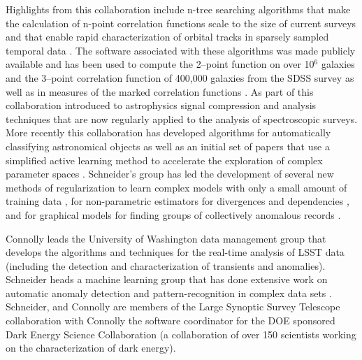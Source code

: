 \documentclass[prd,nofootbib,floatfix,11pt,tightenlines]{revtex4}
\begin{document}
Highlights from this collaboration include n-tree searching algorithms
that make the calculation of n-point correlation functions scale to
the size of current surveys \cite{GrayMoore} and that enable rapid
characterization of orbital tracks in sparsely sampled temporal data
\cite{kubica}. The software associated with these algorithms was made
publicly available and has been used to compute the 2--point function
on over 10$^6$ galaxies and the 3--point correlation function of
400,000 galaxies from the SDSS survey
\cite{Scranton2002,Szapudi2002,Nichol2006,mcbride2011a,mcbride2011b}
as well as in measures of the marked correlation functions
\cite{Skibba2006}.  As part of this collaboration \cite{yip2004a,
  vdp2009, daniel2011} introduced to astrophysics signal compression
and analysis techniques that are now regularly applied to the analysis
of spectroscopic surveys. More recently this collaboration has
developed algorithms for automatically classifying astronomical objects
\cite{vdp2009,daniel2011} as well as an initial set of papers that use
a simplified active learning method to accelerate the exploration of
complex parameter spaces \cite{daniel2012}.  Schneider's group has led
the development of several new methods of regularization to learn
complex models with only a small amount of training data
\cite{YiZhangICML2010,YiZhangSDM2010,YiZhangMultitask2010,YiZhang2011multiECOC,YiZhang2012},
for non-parametric estimators for divergences and dependencies
\cite{poczos11alphadiv,Poczos2011UAI,poczos12CVPR}, and for graphical
models for finding groups of collectively anomalous records \cite{Xiong2011gad,xiong2011fgm}.
 
Connolly leads the University of Washington data management group that
develops the algorithms and techniques for the real-time analysis of
LSST data (including the detection and characterization of
transients and anomalies).  Schneider heads a machine learning group
that has done extensive work on automatic anomaly detection and
pattern-recognition in complex data sets
\cite{Xiong2011gad,poczos12CVPR}.  Schneider, and Connolly are members
of the Large Synoptic Survey Telescope collaboration with Connolly the
software coordinator for the DOE sponsored Dark Energy Science
Collaboration (a collaboration of over 150 scientists working on the
characterization of dark energy).
\end{document}
